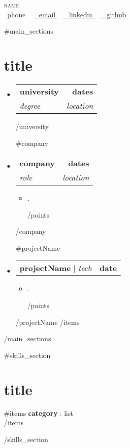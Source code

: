 \documentclass[letterpaper,11pt]{article}
\makeatletter
\newcommand{\resumeItem}[1]{
  \item\small{
    {#1 \vspace{-2pt}}
  }
}
\newcommand{\resumeSubheading}[4]{
  \vspace{-2pt}\item
    \begin{tabular*}{1.0\textwidth}[t]{l@{\extracolsep{\fill}}r}
      \textbf{#1} & \textbf{\small #2} \\
      \textit{\small#3} & \textit{\small #4} \\
    \end{tabular*}\vspace{-7pt}
}
\newcommand{\resumeProjectHeading}[2]{
    \item
    \begin{tabular*}{1.001\textwidth}{l@{\extracolsep{\fill}}r}
      \small#1 & \textbf{\small #2}\\
    \end{tabular*}\vspace{-7pt}
}
\newcommand{\resumeSubHeadingListStart}{\begin{itemize}[leftmargin=0.0in, label={}]}
\newcommand{\resumeSubHeadingListEnd}{\end{itemize}}
\newcommand{\resumeItemListStart}{\begin{itemize}}
\newcommand{\resumeItemListEnd}{\end{itemize}\vspace{-5pt}}
\makeatother
\begin{document}
\begin{center}
    {\Huge \scshape {{{name}}} } \\ \vspace{1pt}
    \small \raisebox{-0.1\height}\faPhone\ {{{phone}}} ~ \href{mailto:{{{email}}}}{\raisebox{-0.2\height}\faEnvelope\  \underline{ {{{email}}} }} ~ 
    \href{https://{{{linkedin}}}}{\raisebox{-0.2\height}\faLinkedin\ \underline{ {{{linkedin}}} }}  ~ 
    \href{https://{{{github}}}}{\raisebox{-0.2\height}\faGithub\ \underline{ {{{github}}} }}
    \vspace{-8pt}
\end{center}


{{#main_sections}}
    \section{ {{{title}}} }
    \resumeSubHeadingListStart
        {{#items}}
            {{#university}}
                \resumeSubheading
                    { {{{university}}} }{ {{{dates}}} }
                    { {{{degree}}} }{ {{{location}}} }
            {{/university}}

            {{#company}}
                \resumeSubheading
                    { {{{company}}} }{ {{{dates}}} }
                    { {{{role}}} }{ {{{location}}} }
                \resumeItemListStart
                    {{#points}}
                        \resumeItem{ {{{.}} }}
                    {{/points}}
                \resumeItemListEnd
            {{/company}}

            {{#projectName}}
                \resumeProjectHeading
                    { \textbf{ {{{projectName}}} } $|$ \emph{ {{{tech}}} } }
                    { {{{date}}} }
                \resumeItemListStart
                    {{#points}}
                        \resumeItem{ {{{.}} }}
                    {{/points}}
                \resumeItemListEnd
            {{/projectName}}
        {{/items}}
    \resumeSubHeadingListEnd
{{/main_sections}}


{{#skills_section}}
    \section{ {{{title}}} }
    \begin{itemize}[leftmargin=0.15in, label={}]
        \small{\item{
            {{#items}}
                \textbf{ {{{category}}} }{: {{{list}}} } \\
            {{/items}}
        }}
    \end{itemize}
{{/skills_section}}
\end{document}
